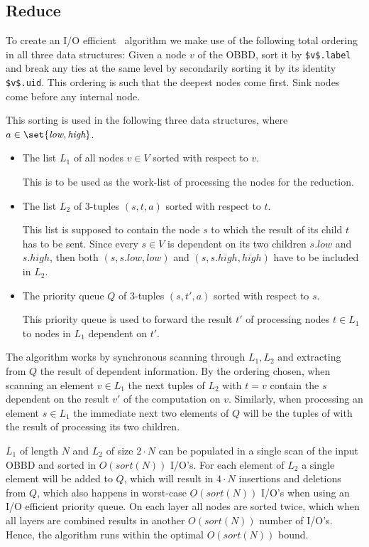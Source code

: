\subsection{Reduce} \label{sec:theory_reduce}
To create an I/O efficient \Reduce\ algorithm we make use of the following total
ordering in all three data structures: Given a node $v$ of the OBBD, sort it by
\lstinline{$v$.label} and break any ties at the same level by secondarily
sorting it by its identity \lstinline{$v$.uid}. This ordering is such that the
deepest nodes come first. Sink nodes come before any internal node.

This sorting is used in the following three data structures, where $a \in
\set{\textit{low}, \textit{high}}$.

\begin{itemize}
\item The list $L_1$ of all nodes $v \in V$ sorted with respect to $v$.

  This is to be used as the work-list of processing the nodes for the reduction.

\item The list $L_2$ of 3-tuples $(s,t,a)$ sorted with respect to $t$.

  This list is supposed to contain the node $s$ to which the result of its child
  $t$ has to be sent. Since every $s \in V$ is dependent on its two children
  $s.\mathit{low}$ and $s.\mathit{high}$, then both $(s, s.\mathit{low},
  \mathit{low})$ and $(s, s.\mathit{high}, \mathit{high})$ have to be included
  in $L_2$.

\item The priority queue $Q$ of 3-tuples $(s,t',a)$ sorted with respect to $s$.

  This priority queue is used to forward the result $t'$ of processing nodes $t
  \in L_1$ to nodes in $L_1$ dependent on $t'$.
\end{itemize}

The algorithm works by synchronous scanning through $L_1, L_2$ and extracting
from $Q$ the result of dependent information. By the ordering chosen, when
scanning an element $v \in L_1$ the next tuples of $L_2$ with $t = v$ contain
the $s$ dependent on the result $v'$ of the computation on $v$. Similarly, when
processing an element $s \in L_1$ the immediate next two elements of $Q$ will be
the tuples of with the result of processing its two children.

$L_1$ of length $N$ and $L_2$ of size $2 \cdot N$ can be populated in a single
scan of the input OBBD and sorted in $O(sort(N))$ I/O's. For each element of
$L_2$ a single element will be added to $Q$, which will result in $4 \cdot N$
insertions and deletions from $Q$, which also happens in worst-case $O(sort(N))$
I/O's when using an I/O efficient priority queue. On each layer all nodes are
sorted twice, which when all layers are combined results in another $O(sort(N))$
number of I/O's. Hence, the algorithm runs within the optimal $O(sort(N))$
bound. \cite{Arge96}

